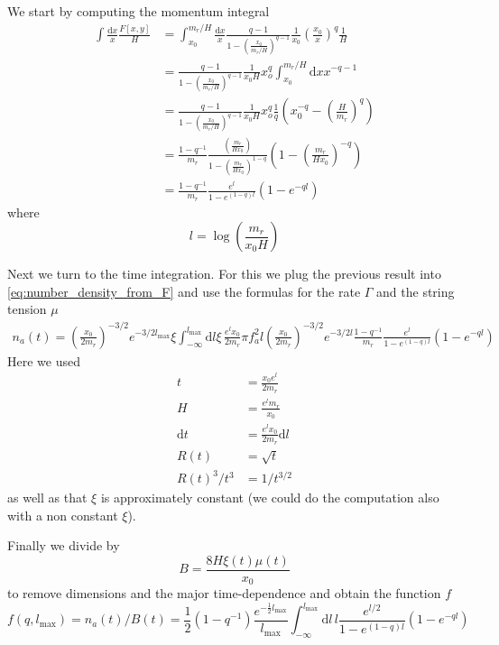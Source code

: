 \documentclass[a4paper]{article}
\begin{document}
We start by computing the momentum integral 
\begin{align}
	\int \frac{\mathrm{d} x}{x} \frac{F[x, y]}{H} &= 
	\int_{x_0}^{m_r/H} \frac{\mathrm{d} x}{x} \frac{q - 1}{1 - \left(\frac{x_0}{m_r/H}\right)^{q - 1}} \frac{1}{x_0} \left( \frac{x_0}{x} \right)^q \frac{1}{H} \\
	&=   \frac{q - 1}{1 - \left(\frac{x_0}{m_r/H}\right)^{q - 1}} \frac{1}{x_0 H} x_o^q \int_{x_0}^{m_r/H} \mathrm{d} x x^{-q - 1} \\
	&= \frac{q - 1}{1 - \left(\frac{x_0}{m_r/H}\right)^{q - 1}} \frac{1}{x_0 H} x_o^q \frac{1}{q} \left( x_0^{-q} - \left( \frac{H}{m_r}\right)^q \right) \\
	&= \frac{1 - q^{-1}}{m_r} \frac{\left(\frac{m_r}{H x_0}\right)}{1 - \left(\frac{m_r}{H x_0}\right)^{1 - q}} \left( 1 - \left(\frac{m_r}{H x_0}\right)^{-q} \right) \\
	&= \frac{1 - q^{-1}}{m_r} \frac{e^l}{1 - e^{(1 - q) l}} (1 - e^{-ql})
\end{align}
where
\begin{equation}
	l = \log \left( \frac{m_r}{x_0 H} \right)
\end{equation}

Next we turn to the time integration. For this we plug the previous result into \eqref{eq:number_density_from_F} and use the formulas for the rate $\Gamma$ and the string tension $\mu$
\begin{align}
	n_a(t) = \left( \frac{x_0}{2 m_r} \right)^{-3/2} e^{-3/2 l_\mathrm{max}} \xi \int_{-\infty}^{l_\mathrm{max}} \mathrm{d} l \xi \, \frac{e^l x_0}{2 m_r} \pi f_a^2 l  \left( \frac{x_0}{2 m_r} \right)^{-3/2} e^{-3/2 l} \frac{1 - q^{-1}}{m_r} \frac{e^l}{1 - e^{(1 - q) l}} (1 - e^{-ql})
\end{align}
Here we used 
\begin{align}
	t &= \frac{x_0 e^l}{2 m_r} \\
	H  &= \frac{e^{l} m_r}{x_0} \\
	\mathrm{d} t &= \frac{e^l x_0}{2 m_r} \mathrm{d} l \\
	R(t) &= \sqrt{t} \\
	R(t)^3 / t^3 &= 1 / t^{3/2}
\end{align}
as well as that $\xi$ is approximately constant (we could do the computation also with a non constant $\xi$).

Finally we divide by 
\begin{equation}
	B = \frac{8 H \xi(t) \mu(t)}{x_0}
\end{equation}
to remove dimensions and the major time-dependence 
and obtain the function $f$
\begin{equation}
	f(q, l_\mathrm{max}) = n_a(t) / B(t) = \frac{1}{2} (1 - q^{-1}) \frac{e^{- \frac{1}{2} l_\mathrm{max}}}{l_\mathrm{max}} \int_{-\infty}^{l_\mathrm{max}} \mathrm{d} l \, l \frac{e^{l/2}}{1 - e^{(1 - q) l}} (1 - e^{-ql})
\end{equation}
\end{document}

